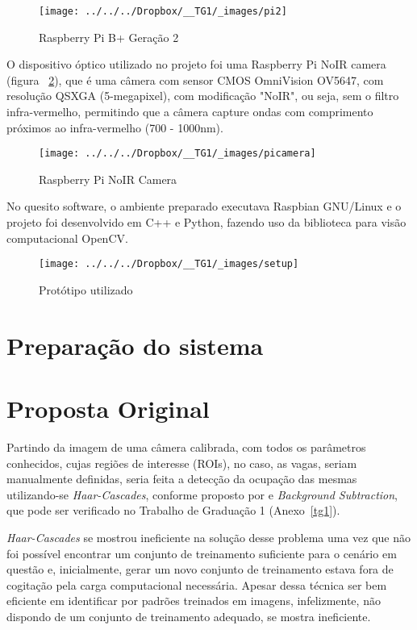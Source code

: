 \documentclass[ecp,tc]{iiufrgs}
\begin{document}
\begin{figure}
	\centering
	\caption{Raspberry Pi B+ Geração 2}
	\texttt{[image: ../../../Dropbox/\_\_TG1/\_images/pi2]}
	\label{fig:rpi}
\end{figure}


O dispositivo óptico utilizado no projeto foi uma Raspberry Pi NoIR camera (figura ~\ref{fig:picam}), que é uma câmera com sensor CMOS OmniVision OV5647, com resolução QSXGA (5-megapixel), com modificação "NoIR", ou seja, sem o filtro infra-vermelho, permitindo que a câmera capture ondas com comprimento próximos ao infra-vermelho (700 - 1000nm).

\begin{figure}
	\centering
	\caption{Raspberry Pi NoIR Camera}
	\texttt{[image: ../../../Dropbox/\_\_TG1/\_images/picamera]}
	\label{fig:picam}
\end{figure}

No quesito software, o ambiente preparado executava Raspbian GNU/Linux e o projeto foi desenvolvido em C++ e Python, fazendo uso da biblioteca para visão computacional OpenCV.

\begin{figure}
	\centering
	\caption{Protótipo utilizado}
	\texttt{[image: ../../../Dropbox/\_\_TG1/\_images/setup]}
	\label{fig:setup}
\end{figure}

\section{Preparação do sistema}



\section{Proposta Original}

Partindo da imagem de uma câmera calibrada, com todos os parâmetros conhecidos, cujas regiões de interesse (ROIs), no caso, as vagas, seriam manualmente definidas, seria feita a detecção da ocupação das mesmas utilizando-se  \textit{Haar-Cascades}, conforme proposto por  e \textit{Background Subtraction}, que pode ser verificado no Trabalho de Graduação 1 (Anexo~\ref{tg1}).

\textit{Haar-Cascades} se mostrou ineficiente na solução desse problema uma vez que não foi possível encontrar um conjunto de treinamento suficiente para o cenário em questão e, inicialmente, gerar um novo conjunto de treinamento estava fora de cogitação pela carga computacional necessária. Apesar dessa técnica ser bem eficiente em identificar por padrões treinados em imagens, infelizmente, não dispondo de um conjunto de treinamento adequado, se mostra ineficiente.
\end{document}
